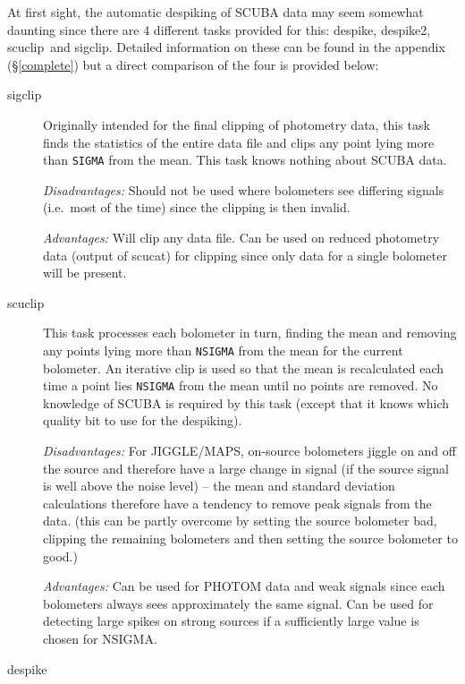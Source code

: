 \documentclass[twoside,11pt]{article}
\newcommand{\task}[1]{{\sf #1}}
\newcommand{\param}[1]{{\tt #1}}
\newcommand{\scucat}{\htmlref{\task{scucat}}{SCUCAT}}
\newcommand{\sigclip}{\htmlref{\task{sigclip}}{SIGCLIP}}
\newcommand{\despike}{\htmlref{\task{despike}}{DESPIKE}}
\newcommand{\despikeb}{\htmlref{\task{despike2}}{DESPIKE2}}
\newcommand{\scuclip}{\htmlref{\task{scuclip}}{SCUCLIP}}
\newcommand{\htmlref}[2]{#1}
\renewcommand{\_}{\texttt{\symbol{95}}}
\begin{document}
At first sight, the automatic despiking of SCUBA data may seem somewhat
daunting since there are 4 different tasks provided for this: \despike,
\despikeb, \scuclip\ and \sigclip. Detailed information on these can be found
in the appendix (\S\ref{complete}) but a direct comparison of the four is
provided below:

\begin{description}
\item[\sigclip] \mbox{}

Originally intended for the final clipping of photometry data, this task
finds the statistics of the entire data file and clips any point lying more
than \param{SIGMA} from the mean. This task knows nothing about SCUBA data.

\textit{Disadvantages:} Should not be used where bolometers see differing
signals (i.e.\ most of the time) since the clipping is then invalid.

\textit{Advantages:} Will clip any data file. Can be used on reduced
photometry data (output of \scucat) for clipping since only data for a single
bolometer will be present.

\item[\scuclip] \mbox{}

This task processes each bolometer in turn, finding the mean and removing any
points lying more than \param{NSIGMA} from the mean for the current bolometer.
An iterative clip is used so that the mean is recalculated each time a point
lies \param{NSIGMA} from the mean until no points are removed.
No knowledge of SCUBA is required by this task (except that it knows which 
quality bit to use for the despiking).

\textit{Disadvantages:} For JIGGLE/MAPS, on-source bolometers jiggle on and
off the source and therefore have a large change in signal (if the source
signal is well above the noise level) -- the mean and standard deviation
calculations therefore have a tendency to remove peak signals from the data.
(this can be partly overcome by setting the source bolometer bad, clipping the
remaining bolometers and then setting the source bolometer to good.)

\textit{Advantages:} Can be used for PHOTOM data and weak signals since
each bolometers always sees approximately the same signal. Can be used for
detecting large spikes on strong sources if a sufficiently large value is
chosen for NSIGMA.


\item[\despike] \mbox{}


\end{description}
\end{document}
